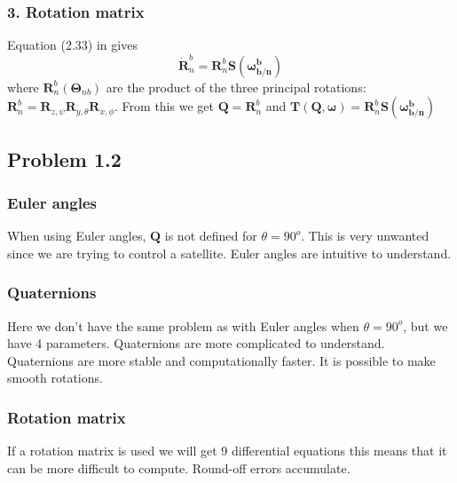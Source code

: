 \subsubsection*{3. Rotation matrix}
Equation (2.33) in \cite{Fossen2011} gives
\begin{equation}
    \dot{\boldsymbol{R}}_n^b = \boldsymbol{R}_n^b\boldsymbol{S(\boldsymbol{\omega}_{b/n}^b)}
\end{equation}
where $\boldsymbol{R}_n^b(\boldsymbol{\Theta}_{nb})$ are the product of the three principal rotations: $\boldsymbol{R}_n^b = \boldsymbol{R}_{z,\psi}\boldsymbol{R}_{y,\theta}\boldsymbol{R}_{x,\phi}$. From this we get $\boldsymbol{Q} = \boldsymbol{R}_n^b$ and $\boldsymbol{T}(\boldsymbol{Q},\boldsymbol{\omega}) = \boldsymbol{R}_n^b\boldsymbol{S(\boldsymbol{\omega}_{b/n}^b)}$







\subsection*{Problem 1.2}
\subsubsection*{Euler angles}
When using Euler angles, $\boldsymbol{Q}$ is not defined for $\theta = 90^o$. This is very unwanted since we are trying to control a satellite. Euler angles are intuitive to understand. 

\subsubsection*{Quaternions}
Here we don't have the same problem as with Euler angles when $\theta = 90^o$, but we have 4 parameters. Quaternions are more complicated to understand.  Quaternions are more stable and computationally faster. It is possible to make smooth rotations. 
\subsubsection*{Rotation matrix}
If a rotation matrix is used we will get 9 differential equations this means that it can be more difficult to compute. Round-off errors accumulate. 

